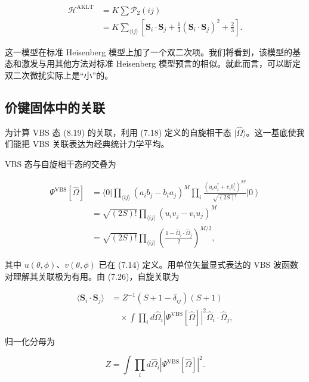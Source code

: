 \begin{align*}
\mathcal {H} ^ {\mathrm{AKLT}} & = K \sum \mathcal {P} _ {2} ( ij )\\
& = K \sum_{\langle ij \rangle} \left[ \mathbf {S} _ {i} \cdot \mathbf {S} _ {j} + \frac {1}{3} \left( \mathbf {S} _ {i} \cdot \mathbf {S} _ {j} \right) ^ {2} + \frac {2}{3} \right].
\tag{8.26}
\end{align*}

这一模型在标准 Heisenberg 模型上加了一个双二次项。我们将看到，该模型的基态和激发与用其他方法对标准 Heisenberg 模型预言的相似。就此而言，可以断定双二次微扰实际上是“小”的。

\subsection{价键固体中的关联}

为计算 VBS 态 (8.19) 的关联，利用 (7.18) 定义的自旋相干态 $|\hat{\Omega}\rangle$。这一基底使我们能把 VBS 关联表达为经典统计力学平均。

VBS 态与自旋相干态的交叠为

\begin{align*}
\Psi^ {\mathrm{VBS}} [ \hat {\Omega} ] & = \langle 0 | \prod_{\langle ij \rangle} \left( a _ {i} b _ {j} - b _ {i} a _ {j} \right) ^ {M} \prod_ {i} \frac {\left( u _ {i} a _ {i} ^ {\dagger} + v _ {i} b _ {i} ^ {\dagger} \right) ^ {2S}}{\sqrt {( 2 S ) !}} \left| 0 \right\rangle\\
& = \sqrt {( 2 S ) !} \prod_{\langle ij \rangle} \left( u _ {i} v _ {j} - v _ {i} u _ {j} \right) ^ {M}\\
& = \sqrt {( 2 S ) !} \prod_{\langle ij \rangle} \left( \frac {1 - \hat {\Omega} _ {i} \cdot \hat {\Omega} _ {j}}{2} \right) ^ {M/2} ,
\tag{8.27}
\end{align*}

其中 $u(\theta,\phi)$、$v(\theta,\phi)$ 已在 (7.14) 定义。用单位矢量显式表达的 VBS 波函数对理解其关联极为有用。由 (7.26)，自旋关联为

\begin{align*}
\langle \mathbf {S} _ {i} \cdot \mathbf {S} _ {j} \rangle & = Z ^ {- 1} ( S + 1 - \delta_ {ij} ) ( S + 1 )\\
& \quad \times \int \prod_ {i} d \hat {\Omega} _ {i} \left| \Psi^ {\mathrm{VBS}} [ \hat {\Omega} ] \right| ^ {2} \hat {\Omega} _ {i} \cdot \hat {\Omega} _ {j} ,
\tag{8.28}
\end{align*}

归一化分母为

\begin{equation*}
Z = \int \prod_ {i} d \hat {\Omega} _ {i} \left| \Psi^ {\mathrm{VBS}} [ \hat {\Omega} ] \right| ^ {2}.
\tag{8.29}
\end{equation*}

